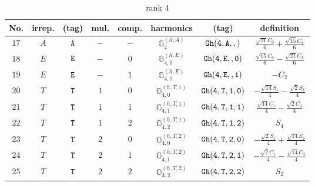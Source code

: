 \documentclass[fleqn,8pt]{jsarticle}
\begin{document}
\begin{table}[ht!]
\begin{center}
\caption{rank 4}
\renewcommand{\arraystretch}{1.3}
\begin{tabular}{cccccccc} \hline \hline
No. & irrep. & (tag) & mul. & comp. & harmonics & (tag) & definition \\ \hline
$ 17 $ & $ A $ & $ {\tt A} $ & $ - $ & $ - $ & $ \mathbb{G}_{4}^{(h,A)} $ & $ {\tt Gh(4,A,,)} $ & $ \frac{\sqrt{21} C_{0}}{6} + \frac{\sqrt{15} C_{4}}{6} $ \\
$ 18 $ & $ E $ & $ {\tt E} $ & $ - $ & $ 0 $ & $ \mathbb{G}_{4,0}^{(h,E)} $ & $ {\tt Gh(4,E,,0)} $ & $ \frac{\sqrt{15} C_{0}}{6} - \frac{\sqrt{21} C_{4}}{6} $ \\
$ 19 $ & $ E $ & $ {\tt E} $ & $ - $ & $ 1 $ & $ \mathbb{G}_{4,1}^{(h,E)} $ & $ {\tt Gh(4,E,,1)} $ & $ - C_{2} $ \\
$ 20 $ & $ T $ & $ {\tt T} $ & $ 1 $ & $ 0 $ & $ \mathbb{G}_{4,0}^{(h,T,1)} $ & $ {\tt Gh(4,T,1,0)} $ & $ - \frac{\sqrt{14} S_{1}}{4} - \frac{\sqrt{2} S_{3}}{4} $ \\
$ 21 $ & $ T $ & $ {\tt T} $ & $ 1 $ & $ 1 $ & $ \mathbb{G}_{4,1}^{(h,T,1)} $ & $ {\tt Gh(4,T,1,1)} $ & $ \frac{\sqrt{14} C_{1}}{4} - \frac{\sqrt{2} C_{3}}{4} $ \\
$ 22 $ & $ T $ & $ {\tt T} $ & $ 1 $ & $ 2 $ & $ \mathbb{G}_{4,2}^{(h,T,1)} $ & $ {\tt Gh(4,T,1,2)} $ & $ S_{4} $ \\
$ 23 $ & $ T $ & $ {\tt T} $ & $ 2 $ & $ 0 $ & $ \mathbb{G}_{4,0}^{(h,T,2)} $ & $ {\tt Gh(4,T,2,0)} $ & $ - \frac{\sqrt{2} S_{1}}{4} + \frac{\sqrt{14} S_{3}}{4} $ \\
$ 24 $ & $ T $ & $ {\tt T} $ & $ 2 $ & $ 1 $ & $ \mathbb{G}_{4,1}^{(h,T,2)} $ & $ {\tt Gh(4,T,2,1)} $ & $ - \frac{\sqrt{2} C_{1}}{4} - \frac{\sqrt{14} C_{3}}{4} $ \\
$ 25 $ & $ T $ & $ {\tt T} $ & $ 2 $ & $ 2 $ & $ \mathbb{G}_{4,2}^{(h,T,2)} $ & $ {\tt Gh(4,T,2,2)} $ & $ S_{2} $ \\
 \hline \hline
\end{tabular}
\end{center}
\end{table}
\end{document}
